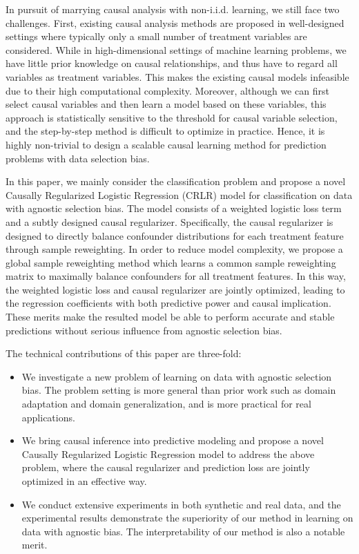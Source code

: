 \documentclass[sigconf]{acmart}
\begin{document}
In pursuit of marrying causal analysis with non-i.i.d. learning, we still face two challenges.
First, existing causal analysis methods are proposed in well-designed settings where typically only a small number of treatment variables are considered.
While in high-dimensional settings of machine learning problems, we have little prior knowledge on causal relationships, and thus have to regard all variables as treatment variables.
This makes the existing causal models infeasible due to their high computational complexity.
Moreover, although we can first select causal variables and then learn a model based on these variables, this approach is statistically sensitive to the threshold for causal variable selection, and the step-by-step method is difficult to optimize in practice.
Hence, it is highly non-trivial to design a scalable causal learning method for prediction problems with data selection bias.

In this paper, we mainly consider the classification problem and propose a novel Causally Regularized Logistic Regression (CRLR) model for classification on data with agnostic selection bias.
The model consists of a weighted logistic loss term and a subtly designed causal regularizer.
Specifically, the causal regularizer is designed to directly balance confounder distributions for each treatment feature through sample reweighting.
In order to reduce model complexity, we propose a global sample reweighting method which learns a common sample reweighting matrix to maximally balance confounders for all treatment features.
In this way, the weighted logistic loss and causal regularizer are jointly optimized, leading to the regression coefficients with both predictive power and causal implication.
These merits make the resulted model be able to perform accurate and stable predictions without serious influence from agnostic selection bias.

The technical contributions of this paper are three-fold:
\begin{itemize}
  \item We investigate a new problem of learning on data with agnostic selection bias.
  The problem setting is more general than prior work such as domain adaptation and domain generalization, and is more practical for real applications.
  \item We bring causal inference into predictive modeling and propose a novel Causally Regularized Logistic Regression model to address the above problem, where the causal regularizer and prediction loss are jointly optimized in an effective way.
  \item We conduct extensive experiments in both synthetic and real data, and the experimental results demonstrate the superiority of our method in learning on data with agnostic bias.
  The interpretability of our method is also a notable merit.
\end{itemize}
\end{document}
